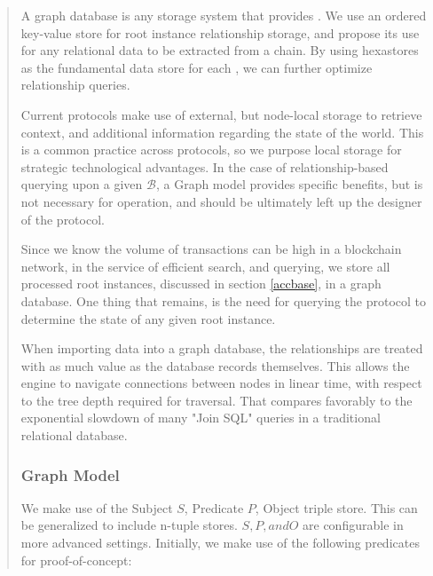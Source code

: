 \documentclass[12pt, titlepage, twocolumn]{report}
\begin{document}
\begin{quotation}
A graph database is any storage system that provides . We use an ordered key-value store for root instance relationship storage, and propose its use for any relational data to be extracted from a chain. By using hexastores as the fundamental data store for each , we can further optimize relationship queries.

Current protocols make use of external, but node-local storage to retrieve context, and additional information regarding the state of the world. This is a common practice across protocols, so we purpose local storage for strategic technological advantages. In the case of relationship-based querying upon a given \(\boldsymbol{\mathcal{B}}\), a Graph model provides specific benefits, but is not necessary for operation, and should be ultimately left up the designer of the protocol.


Since we know the volume of transactions can be high in a blockchain network, in the service of efficient search, and querying, we store all processed root instances, discussed in section \ref{accbase}, in a graph database. One thing that remains, is the need for querying the protocol to determine the state of any given root instance. 

When importing data into a graph database, the relationships are treated with as much value as the database records themselves. This allows the engine to navigate connections between nodes in linear time, with respect to the tree depth required for traversal. That compares favorably to the exponential slowdown of many "Join SQL" queries in a traditional relational database.

\subsubsection{Graph Model}
We make use of the Subject \(S\), Predicate \(P\), Object triple store. This can be generalized to include n-tuple stores. \(S,P, and O\) are configurable in more advanced settings. Initially, we make use of the following predicates for proof-of-concept:


\end{quotation}
\end{document}
